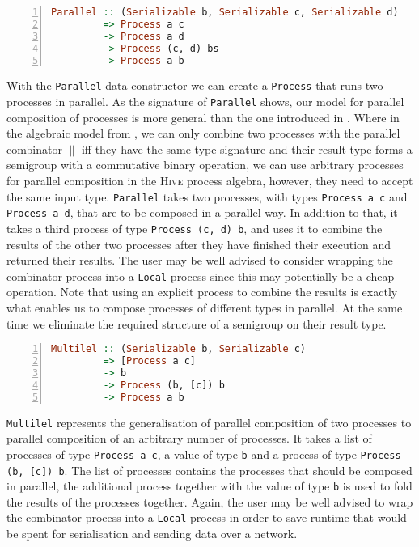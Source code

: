 \begin{lstlisting}[language=Haskell,caption=Signature of the \texttt{Parallel} type constructor.,numbers=left,frame=bt]
Parallel :: (Serializable b, Serializable c, Serializable d)
         => Process a c
         -> Process a d
         -> Process (c, d) bs
         -> Process a b
\end{lstlisting}
With the \texttt{Parallel} data constructor we can create a \texttt{Process} that runs two processes in parallel. As the signature of \texttt{Parallel} shows, our model for parallel composition of processes is more general than the one introduced in . Where in the algebraic model from , we can only combine two processes with the parallel combinator $\parallel$ iff they have the same type signature and their result type forms a semigroup with a commutative binary operation, we can use arbitrary processes for parallel composition in the \textsc{Hive} process algebra, however, they need to accept the same input type. \texttt{Parallel} takes two processes, with types \texttt{Process a c} and \texttt{Process a d}, that are to be composed in a parallel way. In addition to that, it takes a third process of type \texttt{Process (c, d) b}, and uses it to combine the results of the other two processes after they have finished their execution and returned their results. The user may be well advised to consider wrapping the combinator process into a \texttt{Local} process since this may potentially be a cheap operation. Note that using an explicit process to combine the results is exactly what enables us to compose processes of different types in parallel. At the same time we eliminate the required structure of a semigroup on their result type.

\begin{lstlisting}[language=Haskell,caption=Signature of the \texttt{Multilel} type constructor.,numbers=left,frame=bt]
Multilel :: (Serializable b, Serializable c)
         => [Process a c]
         -> b
         -> Process (b, [c]) b
         -> Process a b
\end{lstlisting}
\texttt{Multilel} represents the generalisation of parallel composition of two processes to parallel composition of an arbitrary number of processes. It takes a list of processes of type \texttt{Process a c}, a value of type \texttt{b} and a process of type \texttt{Process (b, [c]) b}. The list of processes contains the processes that should be composed in parallel, the additional process together with the value of type \texttt{b} is used to fold the results of the processes together. Again, the user may be well advised to wrap the combinator process into a \texttt{Local} process in order to save runtime that would be spent for serialisation and sending data over a network. 

